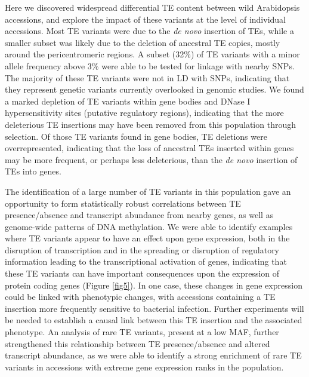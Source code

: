 \documentclass[12pt]{article}
\begin{document}
Here we discovered widespread differential TE content between wild
Arabidopsis accessions, and explore the impact of these variants at the
level of individual accessions. Most TE variants were due to the
\emph{de novo }insertion of TEs, while a smaller subset was likely due
to the deletion of ancestral TE copies, mostly around the
pericentromeric regions. A subset (32\%) of TE variants with a minor
allele frequency above 3\% were able to be tested for linkage with
nearby SNPs. The majority of these TE variants were not in LD with SNPs,
indicating that they represent genetic variants currently overlooked in
genomic studies. We found a marked depletion of TE variants within gene
bodies and DNase I hypersensitivity sites (putative regulatory regions),
indicating that the more deleterious TE insertions may have been removed
from this population through selection. Of those TE variants found in
gene bodies, TE deletions were overrepresented, indicating that the loss
of ancestral TEs inserted within genes may be more frequent, or perhaps
less deleterious, than the \emph{de novo }insertion of TEs into genes.

The identification of a large number of TE variants in this population
gave an opportunity to form statistically robust correlations between TE
presence/absence and transcript abundance from nearby genes, as well as
genome-wide patterns of DNA methylation. We were able to identify
examples where TE variants appear to have an effect upon gene
expression, both in the disruption of transcription and in the spreading
or disruption of regulatory information leading to the transcriptional
activation of genes, indicating that these TE variants can have
important consequences upon the expression of protein coding genes
(Figure \ref{fig5}). In one case, these changes in gene expression could be
linked with phenotypic changes, with accessions containing a TE
insertion more frequently sensitive to bacterial infection. Further
experiments will be needed to establish a causal link between this TE
insertion and the associated phenotype. An analysis of rare TE variants,
present at a low MAF, further strengthened this relationship between TE
presence/absence and altered transcript abundance, as we were able to
identify a strong enrichment of rare TE variants in accessions with
extreme gene expression ranks in the population.
\end{document}
